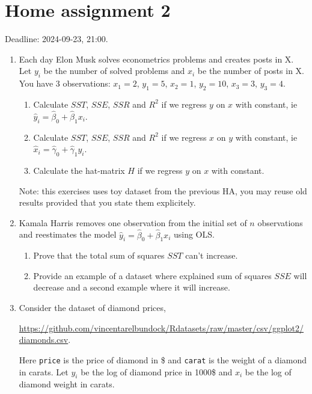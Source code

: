\documentclass[12pt]{article}
\newcommand{\hy}{\hat y}
\newcommand{\hb}{\hat\beta}
\begin{document}
\section*{Home assignment 2}

Deadline: 2024-09-23, 21:00.

\begin{enumerate}

\item Each day Elon Musk solves econometrics problems and creates posts in X.
Let $y_i$ be the number of solved problems and $x_i$ be the number of posts in X. 
You have 3 observations: $x_1 = 2$, $y_1 = 5$, $x_2 = 1$, $y_2 = 10$, $x_3 = 3$, $y_3 = 4$.

\begin{enumerate}
    \item Calculate $SST$, $SSE$, $SSR$ and $R^2$ if we regress $y$ on $x$ with constant, ie $\hy_i = \hb_0 + \hb_1 x_i$.
    \item Calculate $SST$, $SSE$, $SSR$ and $R^2$ if we regress $x$ on $y$ with constant, ie $\hat x_i = \hat\gamma_0 + \hat\gamma_1 y_i$.
    \item Calculate the hat-matrix $H$ if we regress $y$ on $x$ with constant.
\end{enumerate}


Note: this exercises uses toy dataset from the previous HA, you may reuse old results provided that you state them explicitely. 

\item Kamala Harris removes one observation 
from the initial set of $n$ observations and reestimates the model $\hy_i = \hb_0 + \hb_1 x_i$ using OLS.

\begin{enumerate}
    \item Prove that the total sum of squares $SST$ can't increase. 
    \item Provide an example of a dataset where explained sum of squares $SSE$ will decrease and a second example 
    where it will increase. 
\end{enumerate}
  
\item Consider the dataset of diamond prices,

\url{https://github.com/vincentarelbundock/Rdatasets/raw/master/csv/ggplot2/diamonds.csv}.

Here \verb|price| is the price of diamond in \$ and \verb|carat| is the weight of a diamond in carats.
Let $y_i$ be the log of diamond price in 1000\$ and $x_i$ be the log of diamond weight in carats. 


\end{enumerate}
\end{document}
